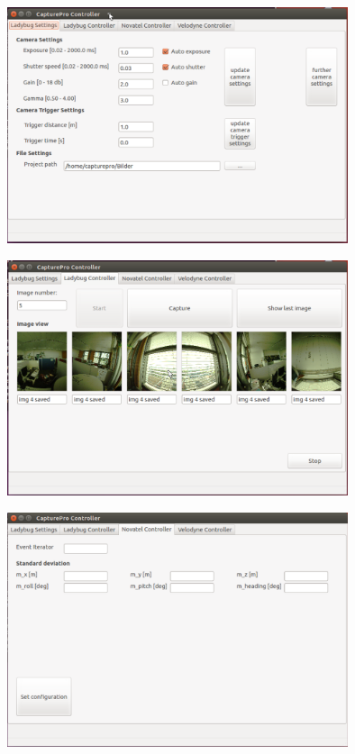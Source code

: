 \documentclass[aspectratio=169]{beamer}
\begin{document}
  \begin{frame}
   \begin{center}
    \includegraphics[width=10cm]{./Abbildungen/GUI_1.png}
   \end{center}
  \end{frame}
  
  \begin{frame}
   \begin{center}
    \includegraphics[width=10cm]{./Abbildungen/GUI_2.png}
   \end{center}
  \end{frame}

  \begin{frame}
   \begin{center}
    \includegraphics[width=10cm]{./Abbildungen/GUI_3.png}
   \end{center}
  \end{frame}
  
\end{document}
